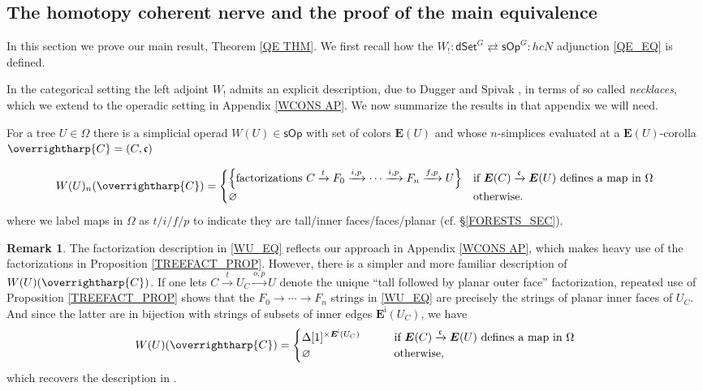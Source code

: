 \documentclass[a4paper,10pt]{article}%
\numberwithin{equation}{section}
\numberwithin{figure}{section}
\theoremstyle{definition} %
\newtheorem{remark}[equation]{Remark}%
\newcommand{\vect}[1]{\text{\overrightharp{\ensuremath{#1}}}}
\newcommand{\1}{\ensuremath{\mathbbm 1}}%
\begin{document}
\subsection{The homotopy coherent nerve and the proof of the main equivalence}
\label{PFMNTHM SEC}


In this section we prove our main result,
Theorem \ref{QE THM}.
We first recall how the
$W_!\colon \mathsf{dSet}^G 
\rightleftarrows 
\mathsf{sOp}^G \colon hcN$
adjunction \eqref{QE_EQ} is defined.

In the categorical setting
the left adjoint $W_!$ admits 
an explicit description, due to Dugger and Spivak \cite{DS11},
in terms of so called \emph{necklaces},
which we extend to the operadic setting in 
Appendix \ref{WCONS AP}.
We now summarize the results in that appendix we will need.



For a tree $U \in \Omega$ there is 
a simplicial operad
$W(U) \in \mathsf{sOp}$
with set of colors $\boldsymbol{E}(U)$
and whose $n$-simplices evaluated at
a $\boldsymbol{E}(U)$-corolla
$\vect{C} = (C,\mathfrak{c})$


\begin{equation}\label{WU_EQ}
	W(U)_n(\vect C) =
	\begin{cases}
	\left\{\text{factorizations }
	C \xrightarrow{t} 
	F_0 \xrightarrow{i,p} 
	\cdots \xrightarrow{i,p}
	F_n \xrightarrow{f,p} U
	\right\}
&
	\mbox{if $\boldsymbol{E}(C) \xrightarrow{\mathfrak{c}} \boldsymbol{E}(U)$ defines a map in $\Omega$}
\\
	\varnothing
&
	\mbox{otherwise.}
\end{cases}
\end{equation}
where we label maps in $\Omega$ as
$t/i/f/p$
to indicate they are 
tall/inner faces/faces/planar
(cf. \S \ref{FORESTS_SEC}).


\begin{remark}
	The factorization description in \eqref{WU_EQ}
	reflects our approach in Appendix \ref{WCONS AP},
	which makes heavy use of the factorizations in 
	Proposition \ref{TREEFACT_PROP}.
	However, there is a simpler and more familiar description of $W(U)(\vect{C})$.
	If one lets
	$C \xrightarrow{t} U_C \xrightarrow{o,p} U$
	denote the unique ``tall followed by planar outer face'' factorization, 
	repeated use of Proposition \ref{TREEFACT_PROP}
	shows that the 
	$F_0 \to \cdots \to F_n$
	strings in \eqref{WU_EQ}
	are precisely the strings of planar inner faces of $U_C$.
	And since the latter are in bijection with strings of subsets of inner edges $\boldsymbol{E}^{\mathsf{i}}(U_C)$, 
	we have 
\begin{equation}\label{WU_EQ2}
	W(U)(\vect C) =
	\begin{cases}
	\Delta[1]^{\times \boldsymbol{E}^{\mathsf{i}}(U_{C})}
	\qquad
&
	\mbox{if $\boldsymbol{E}(C) \xrightarrow{\mathfrak{c}} \boldsymbol{E}(U)$ defines a map in $\Omega$}
\\
\varnothing
&
	\mbox{otherwise,}
	\end{cases}
\end{equation}
which recovers the description in \cite[\S 4]{CM13b}.
\end{remark}
\end{document}
